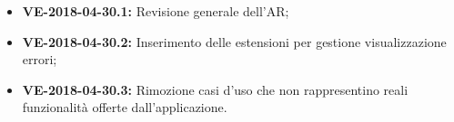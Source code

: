 \documentclass[openany,12pt,a4paper]{article}
\begin{document}
  \begin{itemize} 
  	
      \item \textbf{VE-2018-04-30.1:} Revisione generale dell'AR;
      \item \textbf{VE-2018-04-30.2:} Inserimento delle estensioni per gestione visualizzazione errori;
      \item \textbf{VE-2018-04-30.3:} Rimozione casi d'uso che non rappresentino reali funzionalità offerte dall'applicazione.
      
  \end{itemize} 
   
  
\end{document}
